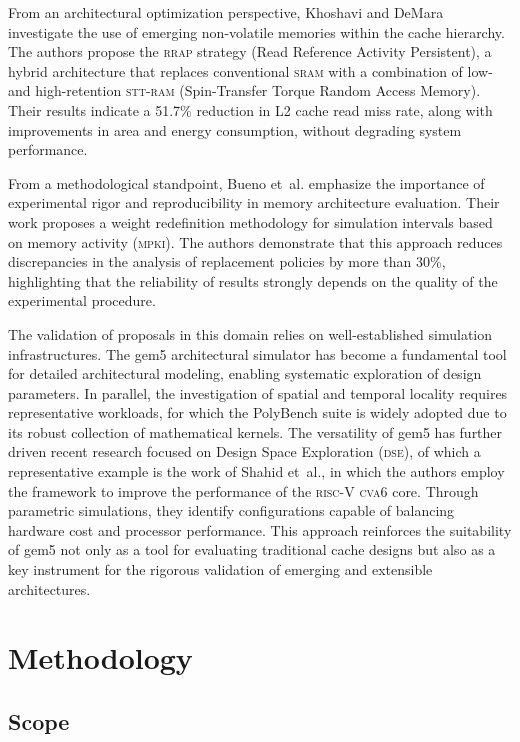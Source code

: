 \documentclass[conference]{IEEEtran}
\begin{document}
From an architectural optimization perspective, Khoshavi and DeMara
\cite{khoshavi:2018} investigate the use of emerging non-volatile memories
within the cache hierarchy. The authors propose the \textsc{rrap} strategy
(Read Reference Activity Persistent), a hybrid architecture that replaces
conventional \textsc{sram} with a combination of low- and high-retention
\textsc{stt}-\textsc{ram} (Spin-Transfer Torque Random Access Memory). Their
results indicate a 51.7\% reduction in L2 cache read miss rate, along with
improvements in area and energy consumption, without degrading system
performance.

From a methodological standpoint, Bueno et~al.\@\cite{bueno:2024} emphasize the
importance of experimental rigor and reproducibility in memory architecture
evaluation. Their work proposes a weight redefinition methodology for
simulation intervals based on memory activity (\textsc{mpki}). The authors
demonstrate that this approach reduces discrepancies in the analysis of
replacement policies by more than 30\%, highlighting that the reliability of
results strongly depends on the quality of the experimental procedure.

The validation of proposals in this domain relies on well-established
simulation infrastructures. The gem5 architectural simulator
\cite{gem5-20:2007} has become a fundamental tool for detailed architectural
modeling, enabling systematic exploration of design parameters. In parallel,
the investigation of spatial and temporal locality requires representative
workloads, for which the PolyBench suite \cite{polybench:2016} is widely
adopted due to its robust collection of mathematical kernels. The versatility
of gem5 has further driven recent research focused on Design Space Exploration
(\textsc{dse}), of which a representative example is the work of Shahid
et~al.\@\cite{shahid:2025}, in which the authors employ the framework to
improve the performance of the \textsc{risc}-V \textsc{cva6} core. Through
parametric simulations, they identify configurations capable of balancing
hardware cost and processor performance. This approach reinforces the
suitability of gem5 not only as a tool for evaluating traditional cache designs
but also as a key instrument for the rigorous validation of emerging and
extensible architectures.

\section{Methodology}
\subsection{Scope}
\end{document}
